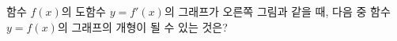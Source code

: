 \noindent\begin{minipage}[t]{0.58\linewidth}\vspace{0pt}\raggedright 함수 $f(x)$의 도함수 $y=f'(x)$의 그래프가 오른쪽 그림과 같을 때, 다음 중 함수 $y=f(x)$의 그래프의 개형이 될 수 있는 것은?\end{minipage}\hfill\begin{minipage}[t]{0.4\linewidth}\vspace{0pt}\centering \resizebox{\ifdim\width>\linewidth\linewidth\else\width\fi}{!}{}\end{minipage}\par
\begin{choicesii}{}{}{}{}{}\end{choicesii}
